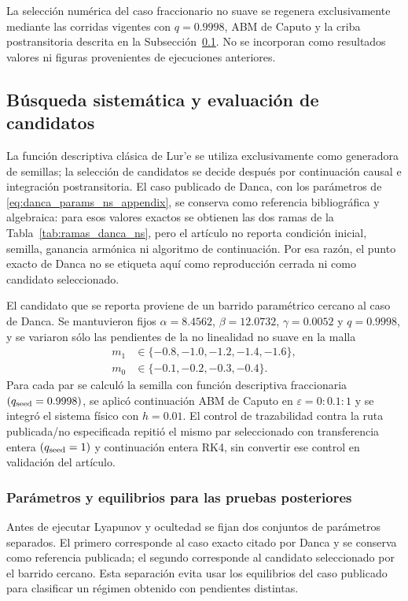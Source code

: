 \documentclass[journal]{IEEEtran}
\begin{document}
La selección numérica del caso fraccionario no suave se regenera
exclusivamente mediante las corridas vigentes con \(q=0.9998\), ABM de
Caputo y la criba postransitoria descrita en la
Subsección~\ref{subsec:busqueda_sistematica_ns}. No se incorporan como
resultados valores ni figuras provenientes de ejecuciones anteriores.

\subsection{Búsqueda sistemática y evaluación de candidatos}
\label{subsec:busqueda_sistematica_ns}

La función descriptiva clásica de Lur'e se utiliza exclusivamente como
generadora de semillas; la selección de candidatos se decide después por
continuación causal e integración postransitoria. El caso publicado de Danca,
con los parámetros de \eqref{eq:danca_params_ns_appendix}, se conserva como
referencia bibliográfica y algebraica: para esos valores exactos se obtienen
las dos ramas de la Tabla~\ref{tab:ramas_danca_ns}, pero el artículo no
reporta condición inicial, semilla, ganancia armónica ni algoritmo de
continuación. Por esa razón, el punto exacto de Danca no se etiqueta aquí como
reproducción cerrada ni como candidato seleccionado.

El candidato que se reporta proviene de un barrido paramétrico cercano al caso
de Danca. Se mantuvieron fijos
\(\alpha=8.4562\), \(\beta=12.0732\), \(\gamma=0.0052\) y \(q=0.9998\), y se
variaron sólo las pendientes de la no linealidad no suave en la malla
\[
\begin{aligned}
m_1&\in\{-0.8,-1.0,-1.2,-1.4,-1.6\},\\
m_0&\in\{-0.1,-0.2,-0.3,-0.4\}.
\end{aligned}
\]
Para cada par se calculó la semilla con función descriptiva fraccionaria
\((q_{\rm seed}=0.9998)\), se aplicó continuación ABM de Caputo en
\(\varepsilon=0:0.1:1\) y se integró el sistema físico con \(h=0.01\). El
control de trazabilidad contra la ruta publicada/no especificada repitió el
mismo par seleccionado con transferencia entera \((q_{\rm seed}=1)\) y
continuación entera RK4, sin convertir ese control en validación del artículo.

\subsubsection{Parámetros y equilibrios para las pruebas posteriores}

Antes de ejecutar Lyapunov y ocultedad se fijan dos conjuntos de parámetros
separados. El primero corresponde al caso exacto citado por Danca y se conserva
como referencia publicada; el segundo corresponde al candidato seleccionado por
el barrido cercano. Esta separación evita usar los equilibrios del caso
publicado para clasificar un régimen obtenido con pendientes distintas.
\end{document}
